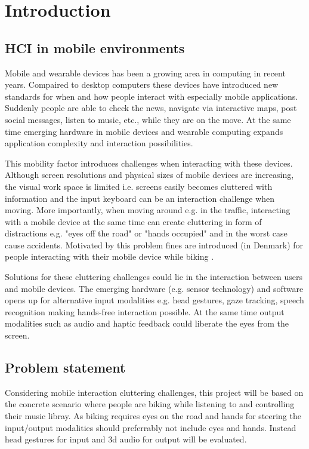\chapter{Introduction}
\section{HCI in mobile environments}
Mobile and wearable devices has been a growing area in computing in recent years. Compaired to desktop computers these devices have introduced new standards for when and how people interact with especially mobile applications. Suddenly people are able to check the news, navigate via interactive maps, post social messages, listen to music, etc., while they are on the move. At the same time emerging hardware in mobile devices and wearable computing expands application complexity and interaction possibilities.

This mobility factor introduces challenges when interacting with these devices. Although screen resolutions and physical sizes of mobile devices are increasing, the visual work space is limited i.e. screens easily becomes cluttered with information and the input keyboard can be an interaction challenge when moving. More importantly, when moving around e.g. in the traffic, interacting with a mobile device at the same time can create cluttering in form of distractions e.g. "eyes off the road" or "hands occupied" and in the worst case cause accidents. Motivated by this problem fines are introduced (in Denmark) for people interacting with their mobile device while biking \cite{cyklistforbundet_bodetakster_????}.

Solutions for these cluttering challenges could lie in the interaction between users and mobile devices. The emerging hardware (e.g. sensor technology) and software opens up for alternative input modalities e.g. head gestures, gaze tracking, speech recognition making hands-free interaction possible. At the same time output modalities such as audio and haptic feedback could liberate the eyes from the screen.

\section{Problem statement}
Considering mobile interaction cluttering challenges, this project will be based on the concrete scenario where people are biking while listening to and controlling their music libray. As biking requires eyes on the road and hands for steering the input/output modalities should preferrably not include eyes and hands. Instead head gestures for input and 3d audio for output will be evaluated.

